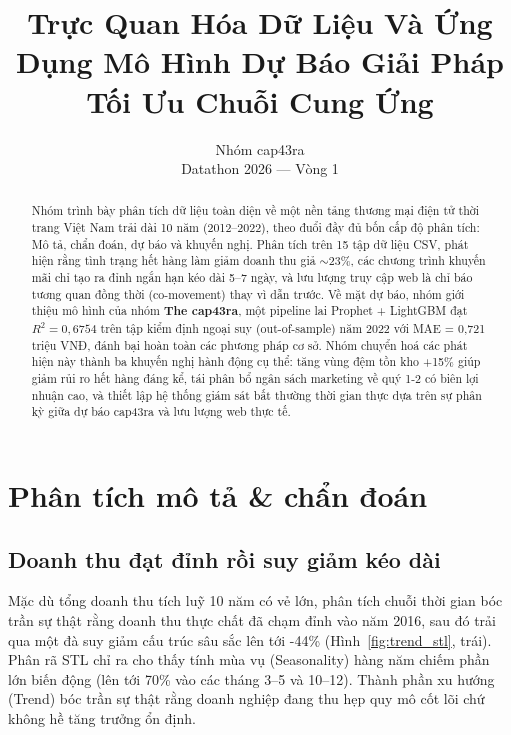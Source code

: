 \documentclass{article}
\title{Trực Quan Hóa Dữ Liệu Và Ứng Dụng Mô Hình Dự Báo Giải Pháp Tối Ưu Chuỗi Cung Ứng}
\author{%
  Nhóm cap43ra \\
  Datathon 2026 --- Vòng 1\\
}
\begin{document}
\maketitle

\begin{abstract}
Nhóm trình bày phân tích dữ liệu toàn diện về một nền tảng thương mại điện tử thời trang Việt Nam trải dài 10 năm (2012--2022), theo đuổi đầy đủ bốn cấp độ phân tích: Mô tả, chẩn đoán, dự báo và khuyến nghị. Phân tích trên 15 tập dữ liệu CSV, phát hiện rằng tình trạng hết hàng làm giảm doanh thu giả $\sim$23\%, các chương trình khuyến mãi chỉ tạo ra đỉnh ngắn hạn kéo dài 5--7 ngày, và lưu lượng truy cập web là chỉ báo tương quan đồng thời (co-movement) thay vì dẫn trước. Về mặt dự báo, nhóm giới thiệu mô hình của nhóm \textbf{The cap43ra}, một pipeline lai Prophet + LightGBM đạt $R^2 = 0{,}6754$ trên tập kiểm định ngoại suy (out-of-sample) năm 2022 với MAE = 0,721 triệu VNĐ, đánh bại hoàn toàn các phương pháp cơ sở. Nhóm chuyển hoá các phát hiện này thành ba khuyến nghị hành động cụ thể: tăng vùng đệm tồn kho +15\% giúp giảm rủi ro hết hàng đáng kể, tái phân bổ ngân sách marketing về quý 1-2 có biên lợi nhuận cao, và thiết lập hệ thống giám sát bất thường thời gian thực dựa trên sự phân kỳ giữa dự báo cap43ra và lưu lượng web thực tế.
\end{abstract}


\section{Phân tích mô tả \& chẩn đoán}

\subsection{Doanh thu đạt đỉnh rồi suy giảm kéo dài}

Mặc dù tổng doanh thu tích luỹ 10 năm có vẻ lớn, phân tích chuỗi thời gian bóc trần sự thật rằng doanh thu thực chất đã chạm đỉnh vào năm 2016, sau đó trải qua một đà suy giảm cấu trúc sâu sắc lên tới -44\% (Hình~\ref{fig:trend_stl}, trái). Phân rã STL \cite{cleveland1990stl} chỉ ra cho thấy tính mùa vụ (Seasonality) hàng năm chiếm phần lớn biến động (lên tới 70\% vào các tháng 3--5 và 10--12). Thành phần xu hướng (Trend) bóc trần sự thật rằng doanh nghiệp đang thu hẹp quy mô cốt lõi chứ không hề tăng trưởng ổn định.
\end{document}
